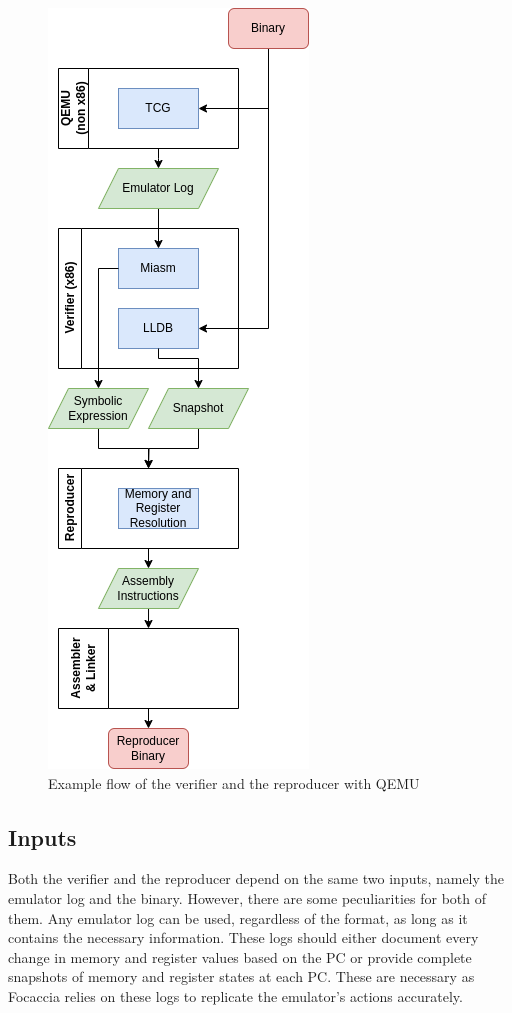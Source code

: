 \begin{figure}[ht]
   \centering
   \includegraphics[width=0.45\linewidth]{figures/ver_and_rep_1}
   \caption[verifier and reproducer]{Example flow of the verifier and the reproducer with QEMU}
   \label{fig:ver_and_rep_1}
\end{figure}

\subsection{Inputs}
Both the verifier and the reproducer depend on the same two inputs, namely the emulator log and the binary.
However, there are some peculiarities for both of them.
Any emulator log can be used, regardless of the format, as long as it contains the necessary information.
These logs should either document every change in memory and register values based on the \ac{PC} or provide complete snapshots of memory and register states at each PC.
These are necessary as Focaccia relies on these logs to replicate the emulator's actions accurately.

